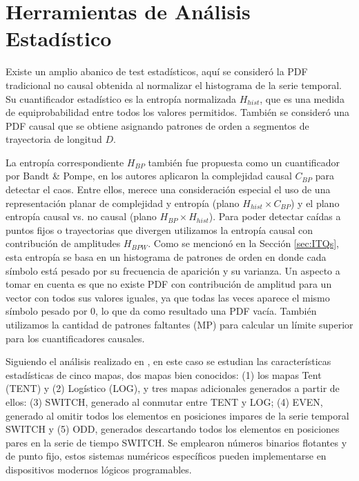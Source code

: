 \section{Herramientas de Análisis Estadístico}

Existe un amplio abanico de test estadísticos, aquí se consideró la PDF tradicional no causal obtenida al normalizar el histograma de la serie temporal.
Su cuantificador estadístico es la entropía normalizada $H_{hist}$, que es una medida de equiprobabilidad entre todos los valores permitidos.
También se consideró una PDF causal que se obtiene asignando patrones de orden a segmentos de trayectoria de longitud $D$.

La entropía correspondiente $H_{BP}$ también fue propuesta como un cuantificador por Bandt \& Pompe, en \cite{Rosso2007} los autores aplicaron la complejidad causal $C_{BP} $ para detectar el caos.
Entre ellos, merece una consideración especial el uso de una representación planar de complejidad y entropía (plano $H_{hist} \times C_{BP}$) y el plano entropía causal vs. no causal (plano $H_{BP} \times H_{hist}$).
Para poder detectar caídas a puntos fijos o trayectorias que divergen utilizamos la entropía causal con contribución de amplitudes $H_{BPW}$.
Como se mencionó en la Sección \ref{sec:ITQs}, esta entropía se basa en un histograma de patrones de orden en donde cada símbolo está pesado por su frecuencia de aparición y su varianza.
Un aspecto a tomar en cuenta es que no existe PDF con contribución de amplitud para un vector con todos sus valores iguales, ya que todas las veces aparece el mismo símbolo pesado por $0$, lo que da como resultado una PDF vacía.
También utilizamos la cantidad de patrones faltantes (MP) para calcular un límite superior para los cuantificadores causales.

Siguiendo el análisis realizado en \cite{Nagaraj2008}, en este caso se estudian las características estadísticas de cinco mapas, dos mapas bien conocidos: (1) los mapas Tent (TENT) y (2) Logístico (LOG), y tres mapas adicionales generados a partir de ellos: (3) SWITCH, generado al conmutar entre TENT y LOG; (4) EVEN, generado al omitir todos los elementos en posiciones impares de la serie temporal SWITCH y (5) ODD, generados descartando todos los elementos en posiciones pares en la serie de tiempo SWITCH.
Se emplearon números binarios flotantes y de punto fijo, estos sistemas numéricos específicos pueden implementarse en dispositivos modernos lógicos programables.